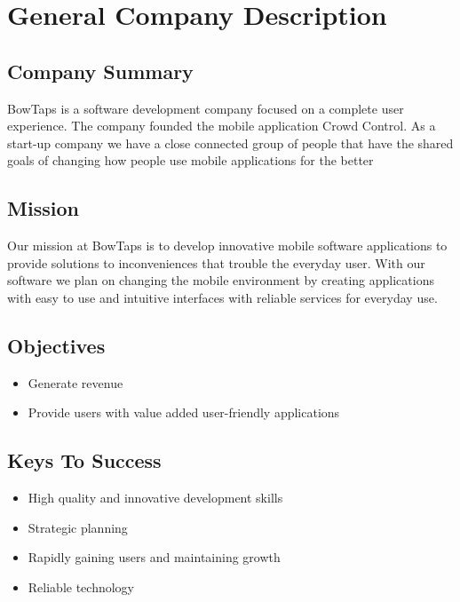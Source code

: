 

\chapter{General Company Description}


\section{Company Summary}

BowTaps is a software development company focused on a complete user experience. The company founded the mobile application Crowd Control. As a start-up company we have a close connected group of people that have the shared goals of changing how people use mobile applications for the better

\section{Mission}

Our mission at BowTaps is to develop innovative mobile software applications to provide solutions to inconveniences that trouble the everyday user. With our software we plan on changing the mobile environment by creating applications with easy to use and  intuitive interfaces with reliable services for everyday use.

\section{Objectives}

	\begin{itemize}
	\item Generate revenue
	\item Provide users with value added user-friendly applications
	\end{itemize}


\section{Keys To Success}

	\begin{itemize}
	\item High quality and innovative development skills
	\item Strategic planning 
	\item Rapidly gaining users and maintaining growth 
	\item Reliable technology
	\end{itemize}

